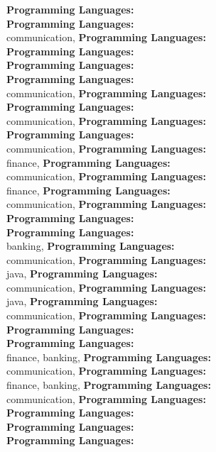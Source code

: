 \textbf{Programming Languages:} \\
\textbf{Programming Languages:} \\
communication, \textbf{Programming Languages:} \\
\textbf{Programming Languages:} \\
\textbf{Programming Languages:} \\
\textbf{Programming Languages:} \\
communication, \textbf{Programming Languages:} \\
\textbf{Programming Languages:} \\
communication, \textbf{Programming Languages:} \\
\textbf{Programming Languages:} \\
communication, \textbf{Programming Languages:} \\
finance, \textbf{Programming Languages:} \\
communication, \textbf{Programming Languages:} \\
finance, \textbf{Programming Languages:} \\
communication, \textbf{Programming Languages:} \\
\textbf{Programming Languages:} \\
\textbf{Programming Languages:} \\
banking, \textbf{Programming Languages:} \\
communication, \textbf{Programming Languages:} \\
java, \textbf{Programming Languages:} \\
communication, \textbf{Programming Languages:} \\
java, \textbf{Programming Languages:} \\
communication, \textbf{Programming Languages:} \\
\textbf{Programming Languages:} \\
\textbf{Programming Languages:} \\
finance, banking, \textbf{Programming Languages:} \\
communication, \textbf{Programming Languages:} \\
finance, banking, \textbf{Programming Languages:} \\
communication, \textbf{Programming Languages:} \\
\textbf{Programming Languages:} \\
\textbf{Programming Languages:} \\
\textbf{Programming Languages:} \\
